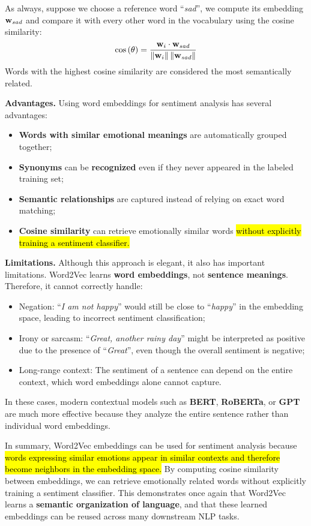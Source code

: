 \highspace
As always, suppose we choose a reference word ``\emph{sad}'', we compute its embedding $\mathbf{w}_{\emph{sad}}$ and compare it with every other word in the vocabulary using the cosine similarity:
\begin{equation*}
    \cos\left(\theta\right) = \frac{\mathbf{w}_{i} \cdot \mathbf{w}_{\emph{sad}}}{\left\|\mathbf{w}_{i}\right\| \left\|\mathbf{w}_{\emph{sad}}\right\|}
\end{equation*}
Words with the highest cosine similarity are considered the most semantically related.

\highspace
\textcolor{Green3}{ \textbf{Advantages.}} Using word embeddings for sentiment analysis has several advantages:
\begin{itemize}
    \item \textbf{Words with similar emotional meanings} are automatically grouped together;
    \item \textbf{Synonyms} can be \textbf{recognized} even if they never appeared in the labeled training set;
    \item \textbf{Semantic relationships} are captured instead of relying on exact word matching;
    \item \textbf{Cosine similarity} can retrieve emotionally similar words \hl{without explicitly training a sentiment classifier.}
\end{itemize}
\textcolor{Red2}{ \textbf{Limitations.}} Although this approach is elegant, it also has important limitations. Word2Vec learns \textbf{word embeddings}, not \textbf{sentence meanings}. Therefore, it cannot correctly handle:
\begin{itemize}
    \item Negation: ``\emph{I am not happy}'' would still be close to ``\emph{happy}'' in the embedding space, leading to incorrect sentiment classification;
    \item Irony or sarcasm: ``\emph{Great, another rainy day}'' might be interpreted as positive due to the presence of ``\emph{Great}'', even though the overall sentiment is negative;
    \item Long-range context: The sentiment of a sentence can depend on the entire context, which word embeddings alone cannot capture.
\end{itemize}
In these cases, modern contextual models such as \textbf{BERT}, \textbf{RoBERTa}, or \textbf{GPT} are much more effective because they analyze the entire sentence rather than individual word embeddings.

\highspace
In summary, Word2Vec embeddings can be used for sentiment analysis because \hl{words expressing similar emotions appear in similar contexts and therefore become neighbors in the embedding space.} By computing cosine similarity between embeddings, we can retrieve emotionally related words without explicitly training a sentiment classifier. This demonstrates once again that Word2Vec learns a \textbf{semantic organization of language}, and that these learned embeddings can be reused across many downstream NLP tasks.